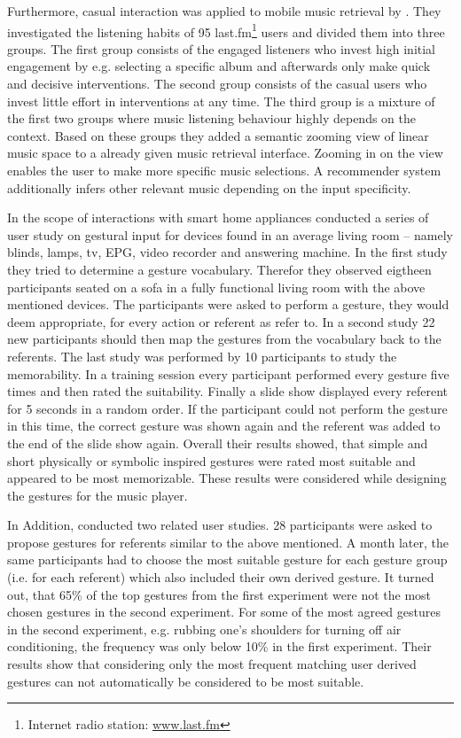 Furthermore, casual interaction was applied to mobile music retrieval by \cite{boland2015engaging}. They investigated the listening habits of 95 last.fm\footnote{Internet radio station: \url{www.last.fm}} users and divided them into three groups. The first group consists of the engaged listeners who invest high initial engagement by e.g. selecting a specific album and afterwards only make quick and decisive interventions. The second group consists of the casual users who invest little effort in interventions at any time. The third group is a mixture of the first two groups where music listening behaviour highly depends on the context. Based on these groups they added a semantic zooming view of linear music space to a already given music retrieval interface. Zooming in on the view enables the user to make more specific music selections. A recommender system additionally infers other relevant music depending on the input specificity.

In the scope of interactions with smart home appliances \cite{kuhnel2011m} conducted a series of user study on gestural input for devices found in an average living room -- namely blinds, lamps, tv, \ac{EPG}, video recorder and answering machine. In the first study they tried to determine a gesture vocabulary. Therefor they observed eigtheen participants seated on a sofa in a fully functional living room with the above mentioned devices. The participants were asked to perform a gesture, they would deem appropriate, for every action or referent as \cite{wobbrock2009user} refer to. In a second study 22 new participants should then map the gestures from the vocabulary back to the referents. The last study was performed by 10 participants to study the memorability. In a training session every participant performed every gesture five times and then rated the suitability. Finally a slide show displayed every referent for 5 seconds in a random order. If the participant could not perform the gesture in this time, the correct gesture was shown again and the referent was added to the end of the slide show again. Overall their results showed, that simple and short physically or symbolic inspired gestures were rated most suitable and appeared to be most memorizable. These results were considered while designing the gestures for the music player.

In Addition, \cite{choi2012can} conducted two related user studies. 28 participants were asked to propose gestures for referents similar to the above mentioned. A month later, the same participants had to choose the most suitable gesture for each gesture group (i.e. for each referent) which also included their own derived gesture. It turned out, that 65\% of the top gestures from the first experiment were not the most chosen gestures in the second experiment. For some of the most agreed gestures in the second experiment, e.g. rubbing one's shoulders for turning off air conditioning, the frequency was only below 10\% in the first experiment. Their results show that considering only the most frequent matching user derived gestures can not automatically be considered to be most suitable.

